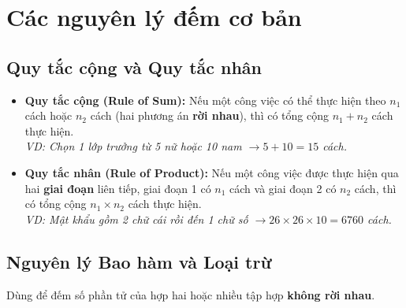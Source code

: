 \documentclass[12pt,a4paper]{article}
\begin{document}
\section{Các nguyên lý đếm cơ bản}

\subsection{Quy tắc cộng và Quy tắc nhân}

\begin{itemize}
  \item \textbf{Quy tắc cộng (Rule of Sum):} Nếu một công việc có thể thực hiện theo $n_1$ cách hoặc $n_2$ cách (hai phương án \textbf{rời nhau}), thì có tổng cộng $n_1 + n_2$ cách thực hiện.\\
  \textit{VD: Chọn 1 lớp trưởng từ 5 nữ hoặc 10 nam $\rightarrow 5 + 10 = 15$ cách.}

  \item \textbf{Quy tắc nhân (Rule of Product):} Nếu một công việc được thực hiện qua hai \textbf{giai đoạn} liên tiếp, giai đoạn 1 có $n_1$ cách và giai đoạn 2 có $n_2$ cách, thì có tổng cộng $n_1 \times n_2$ cách thực hiện.\\
  \textit{VD: Mật khẩu gồm 2 chữ cái rồi đến 1 chữ số $\rightarrow 26 \times 26 \times 10 = 6760$ cách.}
\end{itemize}

\subsection{Nguyên lý Bao hàm và Loại trừ}

Dùng để đếm số phần tử của hợp hai hoặc nhiều tập hợp \textbf{không rời nhau}.
\end{document}
